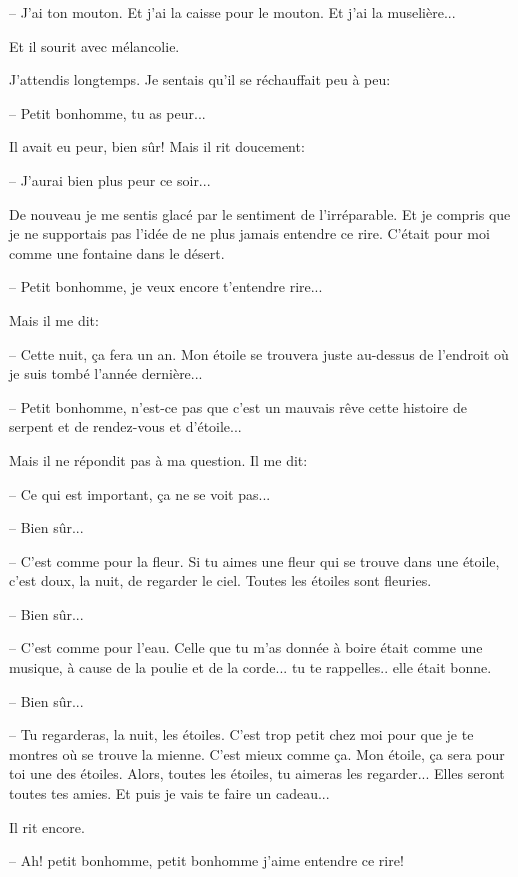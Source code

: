 \documentclass[a4paper]{report}
\begin{document}
-- J'ai ton mouton. Et j'ai la caisse pour le mouton. Et j'ai la muselière...

Et il sourit avec mélancolie.

J'attendis longtemps. Je sentais qu'il se réchauffait peu à peu:

-- Petit bonhomme, tu as peur...

Il avait eu peur, bien sûr! Mais il rit doucement:

-- J'aurai bien plus peur ce soir...

De nouveau je me sentis glacé par le sentiment de l'irréparable. Et je compris que je ne supportais pas l'idée de ne plus jamais entendre ce rire. C'était pour moi comme une fontaine dans le désert.

-- Petit bonhomme, je veux encore t'entendre rire...

Mais il me dit:

-- Cette nuit, ça fera un an. Mon étoile se trouvera juste au-dessus de l'endroit où je suis tombé l'année dernière...

-- Petit bonhomme, n'est-ce pas que c'est un mauvais rêve cette histoire de serpent et de rendez-vous et d'étoile...

Mais il ne répondit pas à ma question. Il me dit:

-- Ce qui est important, ça ne se voit pas...

-- Bien sûr...

-- C'est comme pour la fleur. Si tu aimes une fleur qui se trouve dans une étoile, c'est doux, la nuit, de regarder le ciel. Toutes les étoiles sont fleuries.

-- Bien sûr...

-- C'est comme pour l'eau. Celle que tu m'as donnée à boire était comme une musique, à cause de la poulie et de la corde... tu te rappelles.. elle était bonne.

-- Bien sûr...

-- Tu regarderas, la nuit, les étoiles. C'est trop petit chez moi pour que je te montres où se trouve la mienne. C'est mieux comme ça. Mon étoile, ça sera pour toi une des étoiles. Alors, toutes les étoiles, tu aimeras les regarder... Elles seront toutes tes amies. Et puis je vais te faire un cadeau...

Il rit encore.

-- Ah! petit bonhomme, petit bonhomme j'aime entendre ce rire!
\end{document}
